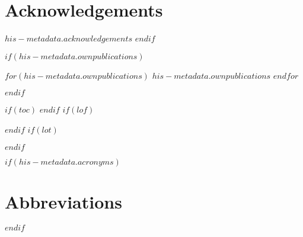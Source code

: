 \chapter*{Acknowledgements}
$his-metadata.acknowledgements$
$endif$
    
$if(his-metadata.ownpublications)$
\begin{ownpublications}
	$for(his-metadata.ownpublications)$
	$his-metadata.ownpublications$
	$endfor$
\end{ownpublications}
$endif$

$if(toc)$
\tableofcontents
$endif$
$if(lof)$
\listoffigures
$endif$
$if(lot)$
\listoftables
$endif$

$if(his-metadata.acronyms)$
\isdissertation{\cleardoublepage}{\clearpage}
\chapter*{Abbreviations}
\renewcommand{\glossarysection}[2][]{} %
\printglossary
$endif$

\isdissertation{\cleardoublepage}{\clearpage}
\setcounter{page}{1}%
\pagestyle{headings}


